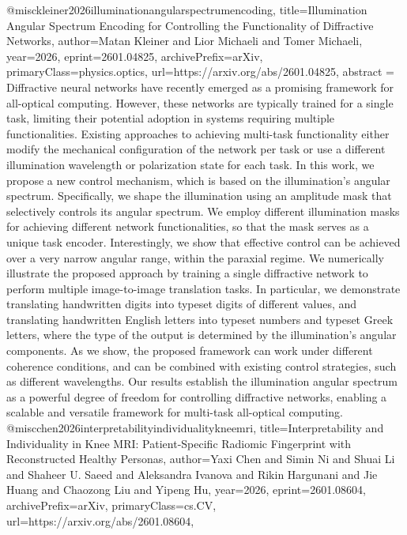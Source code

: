 {}@misc{kleiner2026illuminationangularspectrumencoding,
      title={Illumination Angular Spectrum Encoding for Controlling the Functionality of Diffractive Networks}, 
      author={Matan Kleiner and Lior Michaeli and Tomer Michaeli},
      year={2026},
      eprint={2601.04825},
      archivePrefix={arXiv},
      primaryClass={physics.optics},
      url={https://arxiv.org/abs/2601.04825},
      abstract = {Diffractive neural networks have recently emerged as a promising framework for all-optical computing. However, these networks are typically trained for a single task, limiting their potential adoption in systems requiring multiple functionalities. Existing approaches to achieving multi-task functionality either modify the mechanical configuration of the network per task or use a different illumination wavelength or polarization state for each task. In this work, we propose a new control mechanism, which is based on the illumination's angular spectrum. Specifically, we shape the illumination using an amplitude mask that selectively controls its angular spectrum. We employ different illumination masks for achieving different network functionalities, so that the mask serves as a unique task encoder. Interestingly, we show that effective control can be achieved over a very narrow angular range, within the paraxial regime. We numerically illustrate the proposed approach by training a single diffractive network to perform multiple image-to-image translation tasks. In particular, we demonstrate translating handwritten digits into typeset digits of different values, and translating handwritten English letters into typeset numbers and typeset Greek letters, where the type of the output is determined by the illumination's angular components. As we show, the proposed framework can work under different coherence conditions, and can be combined with existing control strategies, such as different wavelengths. Our results establish the illumination angular spectrum as a powerful degree of freedom for controlling diffractive networks, enabling a scalable and versatile framework for multi-task all-optical computing.}
}@misc{chen2026interpretabilityindividualitykneemri,
      title={Interpretability and Individuality in Knee MRI: Patient-Specific Radiomic Fingerprint with Reconstructed Healthy Personas}, 
      author={Yaxi Chen and Simin Ni and Shuai Li and Shaheer U. Saeed and Aleksandra Ivanova and Rikin Hargunani and Jie Huang and Chaozong Liu and Yipeng Hu},
      year={2026},
      eprint={2601.08604},
      archivePrefix={arXiv},
      primaryClass={cs.CV},
      url={https://arxiv.org/abs/2601.08604},
}
